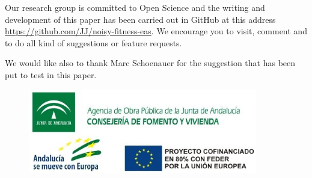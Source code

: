 \documentclass{svmult}
\begin{document}
Our research group is committed to Open Science and the writing and
development of this paper has been carried out in GitHub at this
address \url{https://github.com/JJ/noisy-fitness-eas}. We encourage you
to visit, comment and to do all kind of suggestions or feature
requests.

We would like also to thank Marc Schoenauer for the suggestion that
has been put to test in this paper.


\begin{figure}[!h]
\begin{center}
\includegraphics[width=10cm]{../images/logos_SIPESCA_2.jpg}
\end{center}
\end{figure}


  
\end{document}
